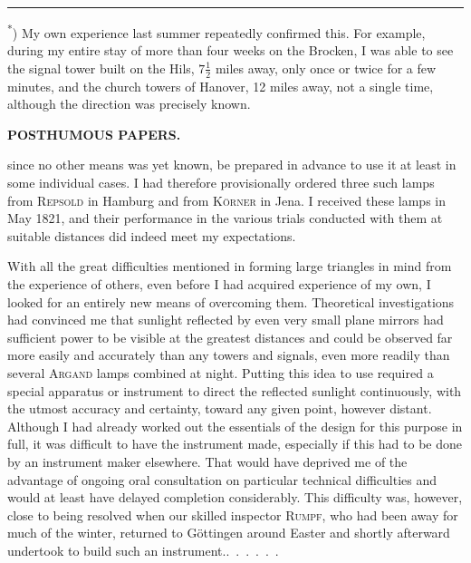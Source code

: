 \par\smallskip\noindent\rule{.24\linewidth}{.4pt}\par\smallskip
{\footnotesize
\noindent\hspace*{\parindent}\textsuperscript{*}) My own experience last summer repeatedly confirmed this.
For example, during my entire stay of more than four weeks on the Brocken, I was able to see the signal tower built
on the Hils, \(7\tfrac{1}{2}\) miles away, only once or twice for a few minutes, and the church towers of Hanover,
12 miles away, not a single time, although the direction was precisely known.\par}
\clearpage

\noindent{}\hfill{\small\textbf{POSTHUMOUS PAPERS.}}\hfill\null\par\medskip
\noindent since no other means was yet known, be prepared in advance to use
it at least in some individual cases. I had therefore provisionally ordered three
such lamps from \textsc{Repsold} in Hamburg and from \textsc{Körner} in Jena. I received
these lamps in May 1821, and their performance in the various trials conducted
with them at suitable distances did indeed meet my expectations.

\par\noindent\hspace*{\parindent}With all the great difficulties mentioned in forming large triangles in
mind from the experience of others, even before I had acquired experience
of my own, I looked for an entirely new means of overcoming them.
Theoretical investigations had convinced me that sunlight reflected by even
very small plane mirrors had sufficient power to be visible at the greatest
distances and could be observed far more easily and accurately than any towers
and signals, even more readily than several \textsc{Argand} lamps combined at night.
Putting this idea to use required a special apparatus or instrument to direct
the reflected sunlight continuously, with the utmost accuracy and certainty,
toward any given point, however distant. Although I had already worked out
the essentials of the design for this purpose in full, it was difficult to have
the instrument made, especially if this had to be done by an instrument maker
elsewhere. That would have deprived me of the advantage of ongoing oral
consultation on particular technical difficulties and would at least have delayed
completion considerably. This difficulty was, however, close to being resolved
when our skilled inspector \textsc{Rumpf}, who had been away for much of the winter,
returned to Göttingen around Easter and shortly afterward undertook to build
such an \mbox{instrument.\enspace\mbox{.\ .\ .\ .\ .\ .}}

